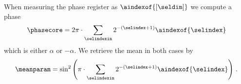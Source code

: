 When measuring the phase register as $\aindexof{[\seldim]}$ we compute a phase
\begin{align*}
    \phasecore
    =2\pi \cdot \sum_{\selindexin} 2^{-(\selindex+1)} \aindexof{\selindex} %
\end{align*}
which is either $\alpha$ or $-\alpha$.
We retrieve the mean in both cases by
\begin{align*}
    \meanparam
    = \sin^2\left(\pi \cdot \sum_{\selindexin} 2^{-(\selindex+1)} \aindexof{\selindex}\right) \, .
\end{align*}

